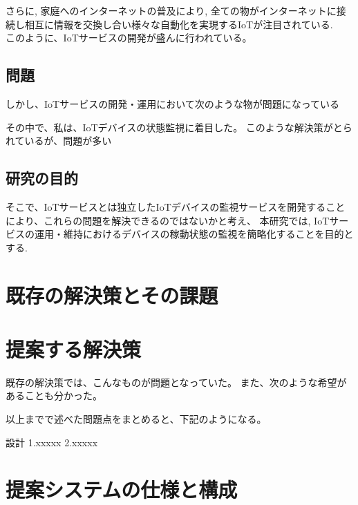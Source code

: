 \documentclass[a4paper]{jreport}
\begin{document}

さらに, 家庭へのインターネットの普及により, 全ての物がインターネットに接続し相互に情報を交換し合い様々な自動化を実現するIoTが注目されている.\\


このように、IoTサービスの開発が盛んに行われている。
\section{問題}%
しかし、IoTサービスの開発・運用において次のような物が問題になっている



その中で、私は、IoTデバイスの状態監視に着目した。
このような解決策がとられているが、問題が多い

\section{研究の目的}
そこで、IoTサービスとは独立したIoTデバイスの監視サービスを開発することにより、これらの問題を解決できるのではないかと考え、
本研究では, IoTサービスの運用・維持におけるデバイスの稼動状態の監視を簡略化することを目的とする.

\chapter{既存の解決策とその課題}

\chapter{提案する解決策}
既存の解決策では、こんなものが問題となっていた。
また、次のような希望があることも分かった。

以上までで述べた問題点をまとめると、下記のようになる。

設計
1.xxxxx
2.xxxxx

\chapter{提案システムの仕様と構成}
\end{document}
